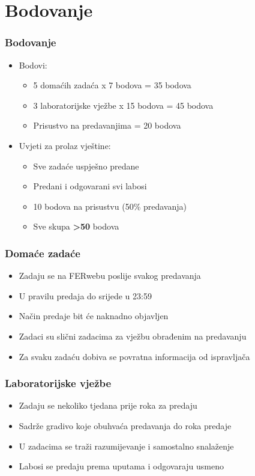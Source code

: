 \documentclass{beamer}
\begin{document}
\section{Bodovanje}
\begin{frame}[t]
\frametitle{Bodovanje}
\begin{itemize}
	\item Bodovi:
	\begin{itemize}
		\item 5 domaćih zadaća x 7 bodova = 35 bodova
		\item 3 laboratorijske vježbe x 15 bodova = 45 bodova
		\item Prisustvo na predavanjima = 20 bodova
	\end{itemize}
	\item Uvjeti za prolaz vještine:
	\begin{itemize}
		\item Sve zadaće uspješno predane
		\item Predani i odgovarani svi labosi
		\item 10 bodova na prisustvu (50\% predavanja)
		\item Sve skupa \textbf{\textgreater 50} bodova
	\end{itemize}
\end{itemize}
\end{frame}

\begin{frame}[t]
\frametitle{Domaće zadaće}
\begin{itemize}
	\item Zadaju se na FERwebu poslije svakog predavanja
	\item U pravilu predaja do srijede u 23:59
	\item Način predaje bit će naknadno objavljen
	\item Zadaci su slični zadacima za vježbu obrađenim na predavanju
	\item Za svaku zadaću dobiva se povratna informacija od ispravljača
\end{itemize}
\end{frame}

\begin{frame}[t]
\frametitle{Laboratorijske vježbe}
\begin{itemize}
	\item Zadaju se nekoliko tjedana prije roka za predaju
	\item Sadrže gradivo koje obuhvaća predavanja do roka predaje
	\item U zadacima se traži razumijevanje i samostalno snalaženje
	\item Labosi se predaju prema uputama i odgovaraju usmeno
\end{itemize}
\end{frame}
\end{document}

